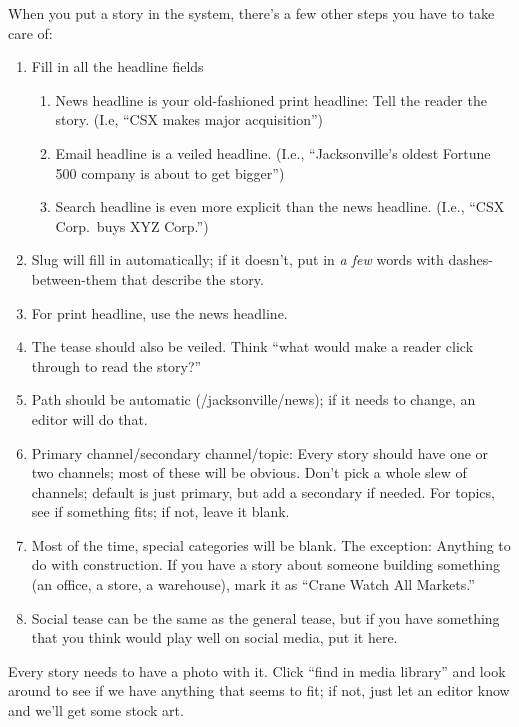 \documentclass[
  11pt,
  american,
  letterpaperpaper,
  extrafontsizes,onecolumn,openright
  ]{memoir}
\providecommand{\tightlist}{%
  \setlength{\itemsep}{0pt}\setlength{\parskip}{0pt}}
\begin{document}
When you put a story in the system, there's a few other steps you have to take care of:

\begin{enumerate}
\def\labelenumi{\arabic{enumi}.}
\tightlist
\item
  Fill in all the headline fields

  \begin{enumerate}
  \def\labelenumii{\arabic{enumii}.}
  \tightlist
  \item
    News headline is your old-fashioned print headline: Tell the reader the story. (I.e, \enquote{CSX makes major acquisition})
  \item
    Email headline is a veiled headline. (I.e., \enquote{Jacksonville's oldest Fortune 500 company is about to get bigger})
  \item
    Search headline is even more explicit than the news headline. (I.e., \enquote{CSX Corp.~buys XYZ Corp.})
  \end{enumerate}
\item
  Slug will fill in automatically; if it doesn't, put in \emph{a few} words with dashes-between-them that describe the story.
\item
  For print headline, use the news headline.
\item
  The tease should also be veiled. Think \enquote{what would make a reader click through to read the story?}
\item
  Path should be automatic (/jacksonville/news); if it needs to change, an editor will do that.
\item
  Primary channel/secondary channel/topic: Every story should have one or two channels; most of these will be obvious. Don't pick a whole slew of channels; default is just primary, but add a secondary if needed. For topics, see if something fits; if not, leave it blank.
\item
  Most of the time, special categories will be blank. The exception: Anything to do with construction. If you have a story about someone building something (an office, a store, a warehouse), mark it as \enquote{Crane Watch All Markets.}
\item
  Social tease can be the same as the general tease, but if you have something that you think would play well on social media, put it here.
\end{enumerate}

Every story needs to have a photo with it. Click \enquote{find in media library} and look around to see if we have anything that seems to fit; if not, just let an editor know and we'll get some stock art.
\end{document}
